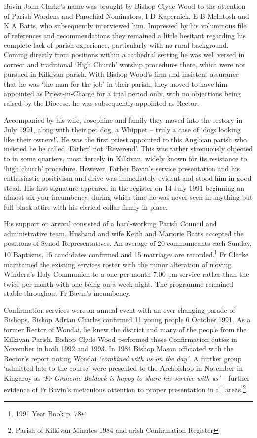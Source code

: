 Bavin John Clarke's name was brought by Bishop Clyde Wood to the attention of Parish Wardens and Parochial Nominators, I D Kapernick, E B McIntosh and K A Batts, who subsequently interviewed him. Impressed by his voluminous file of references and recommendations they remained a little hesitant regarding his complete lack of parish experience, particularly with no rural background. Coming directly from positions within a cathedral setting he was well versed in correct and traditional `High Church' worship procedures there, which were not pursued in Kilkivan parish. With Bishop Wood's firm and insistent assurance that he was `the man for the job' in their parish, they moved to have him appointed as Priest-in-Charge for a trial period only, with no objections being raised by the Diocese. he was subsequently appointed as Rector.



Accompanied by his wife, Josephine and family they moved into the rectory in July 1991, along with their pet dog, a Whippet -- truly a case of `dogs looking like their owners!'. He was the first priest appointed to this Anglican parish who insisted he be called `Father' not `Reverend'. This was rather strenuously objected to in some quarters, most fiercely in Kilkivan, widely known for its resistance to `high church' procedure. However, Father Bavin's service presentation and his enthusiastic positivism and drive was immediately evident and stood him in good stead. His first signature appeared in the register on 14 July 1991 beginning an almost six-year incumbency, during which time he was never seen in anything but full black attire with his clerical collar firmly in place.



His support on arrival consisted of a hard-working Parish Council and administrative team. Husband and wife Keith and Marjorie Batts accepted the positions of Synod Representatives. An average of 20 communicants each Sunday, 10 Baptisms, 15 candidates confirmed and 15 marriages are recorded.\footnote{1991 Year Book p. 78} Fr Clarke maintained the existing services roster with the minor alteration of moving Windera's Holy Communion to a one-per-month 7.00 pm service rather than the twice-per-month with one being on a week night. The programme remained stable throughout Fr Bavin's incumbency.


Confirmation services were an annual event with an ever-changing parade of Bishops. Bishop Adrian Charles confirmed 11 young people 6 October 1991. As a former Rector of Wondai, he knew the district and many of the people from the Kilkivan Parish. Bishop Clyde Wood performed these Confirmation duties in November in both 1992 and 1993. In 1984 Bishop Mason officiated with the Rector's report noting Wondai \emph{`combined with us on the day'}. A further group `admitted late to the course' were presented to the Archbishop in November in Kingaroy as \emph{`Fr Graheme Baldock is happy to share his service with us'} -- further evidence of Fr Bavin's meticulous attention to proper presentation in all areas.\footnote{Parish of Kilkivan Minutes 1984 and arish Confirmation Register}.


